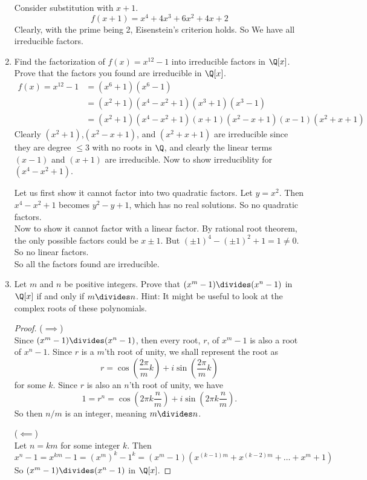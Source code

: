 \documentclass[12pt]{article}
\begin{document}
\begin{enumerate}
		Consider substitution with $x+1$.
		\[f(x+1) = x^4 + 4x^3 + 6x^2 + 4x + 2\]
		Clearly, with the prime being 2, Eisenstein's criterion holds. So We have all irreducible factors.
		
		\item Find the factorization of $f(x) = x^{12} - 1$ into irreducible factors in $\Q[x]$. Prove that the factors you found are irreducible in $\Q[x]$.\m
		\begin{align*}
			f(x) = x^{12}-1 &= (x^6+1)(x^6-1)\\
			&= (x^2+1)(x^4-x^2+1)(x^3+1)(x^3-1)\\
			&= (x^2+1)(x^4-x^2+1)(x+1)(x^2-x+1)(x-1)(x^2+x+1)
		\end{align*}
		Clearly $(x^2+1)$,$(x^2-x+1)$, and $(x^2+x+1)$ are irreducible since they are degree $\leq 3$ with no roots in $\Q$, and clearly the linear terms $(x-1)$ and $(x+1)$ are irreducible. Now to show irreduciblity for $(x^4-x^2+1)$.
		
		Let us first show it cannot factor into two quadratic factors. Let $y = x^2$. Then $x^4-x^2+1$ becomes $y^2-y+1$, which has no real solutions. So no quadratic factors.\\
		Now to show it cannot factor with a linear factor. By rational root theorem, the only possible factors could be $x\pm1$. But $(\pm1)^4-(\pm1)^2+1 = 1 \neq 0$. So no linear factors.\\
		So all the factors found are irreducible.
		
		
		\item Let $m$ and $n$ be positive integers. Prove that $(x^m - 1) \divides (x^n-1)$ in $\Q[x]$ if and only if $m \divides n$. Hint: It might be useful to look at the complex roots of these polynomials.
		\begin{proof}
			($\implies$)\\
			Since $(x^m - 1) \divides (x^n-1)$, then every root, $r$, of $x^m - 1$ is also a root of $x^n-1$. Since $r$ is a $m$'th root of unity, we shall represent the root as
			\[r = \cos(\frac{2\pi}{m}k) + i\sin(\frac{2\pi}{m}k)\]
			for some $k$. Since $r$ is also an $n$'th root of unity, we have
			\[1 = r^n = \cos(2\pi k\frac{n}{m}) + i\sin(2\pi k\frac{n}{m}).\]
			So then $n/m$ is an integer, meaning $m \divides n$.
			
			($\impliedby$)\\
			Let $n = km$ for some integer $k$. Then
			\[x^n-1 = x^{km}-1 = (x^m)^k - 1^k = (x^m-1)(x^{(k-1)m}+x^{(k-2)m}+\ldots+x^m+1)\]
			So $(x^m - 1) \divides (x^n-1)$ in $\Q[x]$.
		\end{proof}
		
	\end{enumerate}
\end{document}
